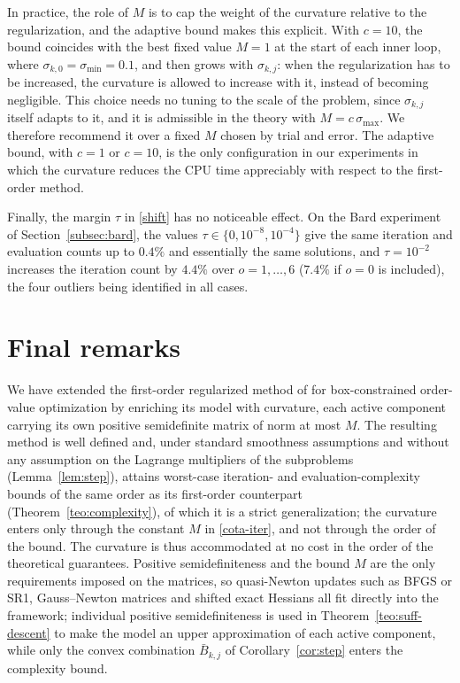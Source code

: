 \documentclass[11pt]{article}
\begin{document}
In practice, the role of $M$ is to cap the weight of the curvature relative to
the regularization, and the adaptive bound makes this explicit. With
$c = 10$, the bound coincides with the best fixed value $M = 1$ at the start of
each inner loop, where $\sigma_{k,0} = \sigma_{\min} = 0.1$, and then grows
with $\sigma_{k,j}$: when the regularization has to be increased, the
curvature is allowed to increase with it, instead of becoming negligible. This
choice needs no tuning to the scale of the problem, since $\sigma_{k,j}$ itself
adapts to it, and it is admissible in the theory with
$M = c\,\sigma_{\max}$. We therefore recommend it over a fixed $M$ chosen by
trial and error. The adaptive bound, with $c = 1$ or $c = 10$, is the only
configuration in our experiments in which the curvature reduces the CPU time
appreciably with respect to the first-order method.

Finally, the margin $\tau$ in \eqref{shift} has no noticeable effect. On the
Bard experiment of Section~\ref{subsec:bard}, the values
$\tau \in \{0, 10^{-8}, 10^{-4}\}$ give the same iteration and evaluation counts
up to $0.4\%$ and essentially the same solutions, and $\tau = 10^{-2}$
increases the iteration count by $4.4\%$ over $o = 1, \dots, 6$ ($7.4\%$ if
$o = 0$ is included), the four outliers being identified in all cases.


\section{Final remarks} \label{sec:final}

We have extended the first-order regularized method of \cite{alvarezovo} for
box-constrained order-value optimization by enriching its model with curvature,
each active component carrying its own positive semidefinite matrix of norm at
most $M$. The resulting method is well defined and, under standard smoothness
assumptions and without any assumption on the Lagrange multipliers of the
subproblems (Lemma~\ref{lem:step}), attains worst-case iteration- and
evaluation-complexity bounds of the same order as its first-order counterpart
(Theorem~\ref{teo:complexity}), of which it is a strict generalization; the curvature enters only through the
constant $M$ in \eqref{cota-iter}, and not through the order of the bound. The
curvature is thus accommodated at no cost in the order of the theoretical
guarantees. Positive semidefiniteness and the bound $M$ are the only
requirements imposed on the matrices, so quasi-Newton updates such as BFGS or
SR1, Gauss--Newton matrices and shifted exact Hessians all fit directly into the
framework; individual positive semidefiniteness is used in
Theorem~\ref{teo:suff-descent} to make the model an upper approximation of each
active component, while only the convex combination $\bar{B}_{k,j}$ of
Corollary~\ref{cor:step} enters the complexity bound.
\end{document}
